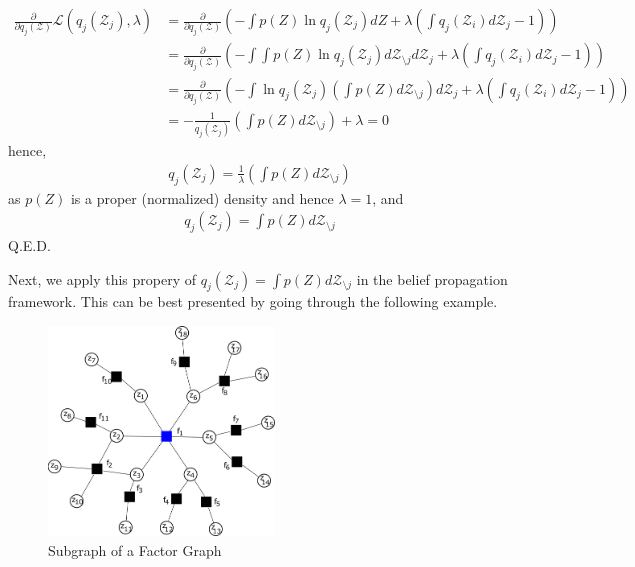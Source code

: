 \documentclass[a4]{article}
\begin{document}
\begin{equation}
\begin{aligned}
\frac{\partial}{\partial q_j(\mathcal{Z})}
\mathcal{L}(q_j(\mathcal{Z}_j), \lambda)
&=
\frac{\partial}{\partial q_j(\mathcal{Z})}\left(
- \int p(Z) \ln q_j(\mathcal{Z}_j) dZ +
\lambda (\int q_j(\mathcal{Z}_i)d\mathcal{Z}_j - 1)
\right)\\
&=
\frac{\partial}{\partial q_j(\mathcal{Z})}\left(
- \int \int p(Z) \ln q_j(\mathcal{Z}_j) d\mathcal{Z}_{\setminus j} d\mathcal{Z}_j +
\lambda (\int q_j(\mathcal{Z}_i)d\mathcal{Z}_j - 1)
\right)\\
&=
\frac{\partial}{\partial q_j(\mathcal{Z})}\left(
- \int \ln q_j(\mathcal{Z}_j) \left(
\int p(Z) d\mathcal{Z}_{\setminus j} \right) d\mathcal{Z}_j +
\lambda (\int q_j(\mathcal{Z}_i)d\mathcal{Z}_j - 1)
\right)\\
&= -\frac{1}{q_j(\mathcal{Z}_j)} \left(\int p(Z) d\mathcal{Z}_{\setminus j} \right) + \lambda = 0
\end{aligned}
\end{equation}
hence,
\begin{equation}
\begin{aligned}
q_j(\mathcal{Z}_j) = \frac{1}{\lambda}\left(\int p(Z) d\mathcal{Z}_{\setminus j} \right)
\end{aligned}
\end{equation}
as $p(Z)$ is a proper (normalized) density and hence $\lambda = 1$, and
\begin{equation}
\begin{aligned}
q_j(\mathcal{Z}_j) = \int p(Z) d\mathcal{Z}_{\setminus j}
\end{aligned}
\end{equation}
Q.E.D.

Next, we apply this propery of $q_j(\mathcal{Z}_j) = \int p(Z) d\mathcal{Z}_{\setminus j}$ in the
belief propagation framework. This can be best presented by going through the following example.

\begin{figure}[!htb]
\centering
\includegraphics[width=6cm]{fig01.png}
\caption{Subgraph of a Factor Graph}
\label{fig:fig01}
\end{figure}
\end{document}

